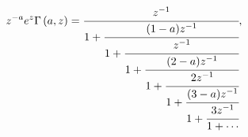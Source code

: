 \[z^{-a}e^{z}\Gamma\left(a,z\right)=\cfrac{z^{-1}}{1+\cfrac{(1-a)z^{-1}}{1+%
\cfrac{z^{-1}}{1+\cfrac{(2-a)z^{-1}}{1+\cfrac{2z^{-1}}{1+\cfrac{(3-a)z^{-1}}{1%
+\cfrac{3z^{-1}}{1+\cdots}}}}}}},\]